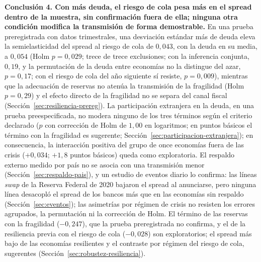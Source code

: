 \textbf{Conclusión 4. Con más deuda, el riesgo de cola pesa más en el spread dentro de la muestra, sin confirmación fuera de ella; ninguna otra condición modifica la transmisión de forma demostrable.} En una prueba preregistrada con datos trimestrales, una desviación estándar más de deuda eleva la semielasticidad del spread al riesgo de cola de $0{,}043$, con la deuda en su media, a $0{,}054$ (Holm $p=0{,}029$; trece de trece exclusiones; con la inferencia conjunta, $0{,}19$, y la permutación de la deuda entre economías no la distingue del azar, $p=0{,}17$; con el riesgo de cola del año siguiente sí resiste, $p=0{,}009$), mientras que la adecuación de reservas no atenúa la transmisión de la fragilidad (Holm $p=0{,}29$) y el efecto directo de la fragilidad no se separa del canal fiscal (Sección~\ref{sec:resiliencia-prereg}). La participación extranjera en la deuda, en una prueba preespecificada, no modera ninguno de los tres términos según el criterio declarado ($p$ con corrección de Holm de $1{,}00$ en logaritmos; en puntos básicos el término con la fragilidad es sugerente; Sección~\ref{sec:participacion-extranjera}); en consecuencia, la interacción positiva del grupo de once economías fuera de las crisis ($+0{,}034$; $+1{,}8$ puntos básicos) queda como exploratoria. El respaldo externo medido por país no se asocia con una transmisión menor (Sección~\ref{sec:respaldo-pais}), y un estudio de eventos diario lo confirma: las líneas \textit{swap} de la Reserva Federal de 2020 bajaron el spread al anunciarse, pero ninguna línea desacopló el spread de los bancos más que en las economías sin respaldo (Sección~\ref{sec:eventos}); las asimetrías por régimen de crisis no resisten los errores agrupados, la permutación ni la corrección de Holm. El término de las reservas con la fragilidad ($-0{,}247$), que la prueba preregistrada no confirma, y el de la resiliencia previa con el riesgo de cola ($-0{,}028$) son exploratorios; el spread más bajo de las economías resilientes y el contraste por régimen del riesgo de cola, sugerentes (Sección~\ref{sec:robustez-resiliencia}).

